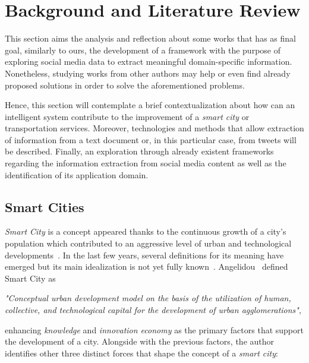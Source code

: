 \chapter{Background and Literature Review} \label{chap:sota}

\minitoc \mtcskip \noindent

This section aims the analysis and reflection about some works that has as final goal, similarly to ours, the development of a framework with the purpose of exploring social media data to extract meaningful domain-specific information. Nonetheless, studying works from other authors may help or even find already proposed solutions in order to solve the aforementioned problems.

Hence, this section will contemplate a brief contextualization about how can an intelligent system contribute to the improvement of a \textit{smart city} or transportation services. Moreover, technologies and methods that allow extraction of information from a text document or, in this particular case, from tweets will be described. Finally, an exploration through already existent frameworks regarding the information extraction from social media content as well as the identification of its application domain.

\section{Smart Cities}\label{sec:smart_cities}

\textit{Smart City} is a concept appeared thanks to the continuous growth of a city's population which contributed to an aggressive level of urban and technological developments~\cite{kn:Cecilia2016}. In the last few years, several definitions for its meaning have emerged but its main idealization is not yet fully known~\cite{kn:Komninos2009}. Angelidou~\cite{kn:Angelidou2015} defined Smart City as

\emph{"Conceptual urban development model on the basis of the utilization of human, collective, and technological capital for the development of urban agglomerations"},

enhancing \textit{knowledge} and \textit{innovation economy} as the primary factors that support the development of a city. Alongside with the previous factors, the author identifies other three distinct forces that shape the concept of a \textit{smart city}:

